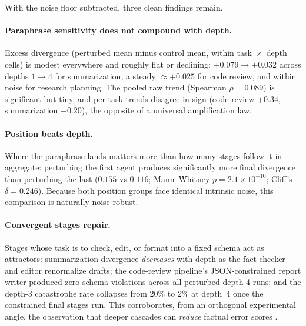 \documentclass[11pt]{article}
\begin{document}
With the noise floor subtracted, three clean findings remain.

\paragraph{Paraphrase sensitivity does not compound with depth.} Excess
divergence (perturbed mean minus control mean, within task~$\times$~depth
cells) is modest everywhere and roughly flat or declining: $+0.079 \to
+0.032$ across depths $1\to4$ for summarization, a steady ${\approx}+0.025$
for code review, and within noise for research planning. The pooled raw
trend (Spearman $\rho = 0.089$) is significant but tiny, and per-task trends
disagree in sign (code review $+0.34$, summarization $-0.20$), the opposite
of a universal amplification law.

\paragraph{Position beats depth.} Where the paraphrase lands matters more
than how many stages follow it in aggregate: perturbing the first agent
produces significantly more final divergence than perturbing the last
($0.155$ vs $0.116$; Mann--Whitney $p = 2.1\times10^{-10}$; Cliff's
$\delta = 0.246$). Because both position groups face identical intrinsic
noise, this comparison is naturally noise-robust.

\paragraph{Convergent stages repair.} Stages whose task is to check, edit,
or format into a fixed schema act as attractors: summarization divergence
\emph{decreases} with depth as the fact-checker and editor renormalize
drafts; the code-review pipeline's JSON-constrained report writer produced
zero schema violations across all perturbed depth-4 runs; and the depth-3
catastrophe rate collapses from 20\% to 2\% at depth~4 once the constrained
final stages run. This corroborates, from an orthogonal experimental angle,
the observation that deeper cascades can \emph{reduce} factual error scores
\citep{hallucascade2026}.
\end{document}
